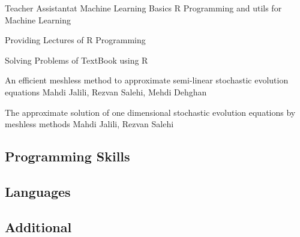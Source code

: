 \begin{minipage}{0.7125\textwidth}
\begin{tcolorbox}[height=0.8\textheight, grow to left by=0.55cm,colframe=white,colback=white]
		{Teacher Assistant}{at Machine Learning Basics}
		{R Programming and utils for Machine Learning}
		{\begin{compactitem}[-]
				\item Providing Lectures of R Programming
				\item Solving Problems of TextBook using R
			\end{compactitem}
		}

		{An efficient meshless method to approximate semi-linear stochastic evolution equations}
		{Mahdi Jalili, Rezvan Salehi, Mehdi Dehghan}

		{The approximate solution of one dimensional stochastic evolution equations by meshless methods}
		{Mahdi Jalili, Rezvan Salehi}


	\end{tcolorbox}
\end{minipage}
\begin{minipage}{0.23\textwidth} %
	\begin{tcolorbox}[height=0.8\textheight, grow to right by=0.5cm, colback=accent,colframe=accent,arc=1mm]
		\vspace{0.5em}
		\subsection*{Programming Skills}

		\vspace{2em}
		\subsection*{Languages}


		\vspace{2em}
		\subsection*{Additional}
	\end{tcolorbox}
\end{minipage}


